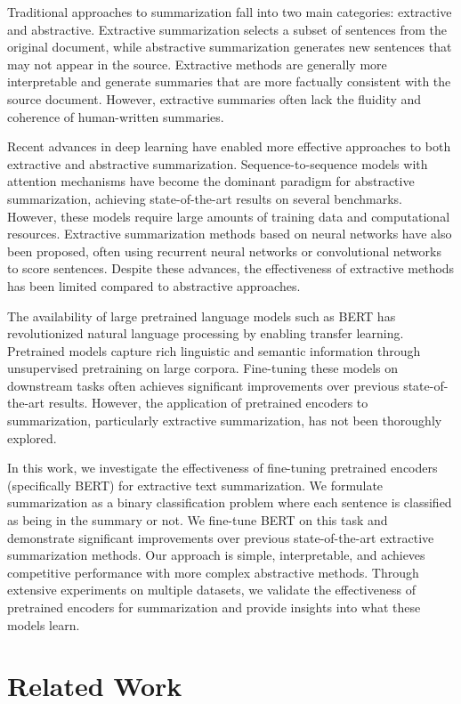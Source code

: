 \documentclass[conference]{IEEEtran}
\begin{document}
Traditional approaches to summarization fall into two main categories: extractive and abstractive. Extractive summarization selects a subset of sentences from the original document, while abstractive summarization generates new sentences that may not appear in the source. Extractive methods are generally more interpretable and generate summaries that are more factually consistent with the source document. However, extractive summaries often lack the fluidity and coherence of human-written summaries.

Recent advances in deep learning have enabled more effective approaches to both extractive and abstractive summarization. Sequence-to-sequence models with attention mechanisms have become the dominant paradigm for abstractive summarization, achieving state-of-the-art results on several benchmarks. However, these models require large amounts of training data and computational resources. Extractive summarization methods based on neural networks have also been proposed, often using recurrent neural networks or convolutional networks to score sentences. Despite these advances, the effectiveness of extractive methods has been limited compared to abstractive approaches.

The availability of large pretrained language models such as BERT has revolutionized natural language processing by enabling transfer learning. Pretrained models capture rich linguistic and semantic information through unsupervised pretraining on large corpora. Fine-tuning these models on downstream tasks often achieves significant improvements over previous state-of-the-art results. However, the application of pretrained encoders to summarization, particularly extractive summarization, has not been thoroughly explored.

In this work, we investigate the effectiveness of fine-tuning pretrained encoders (specifically BERT) for extractive text summarization. We formulate summarization as a binary classification problem where each sentence is classified as being in the summary or not. We fine-tune BERT on this task and demonstrate significant improvements over previous state-of-the-art extractive summarization methods. Our approach is simple, interpretable, and achieves competitive performance with more complex abstractive methods. Through extensive experiments on multiple datasets, we validate the effectiveness of pretrained encoders for summarization and provide insights into what these models learn.

\section{Related Work}
\end{document}
